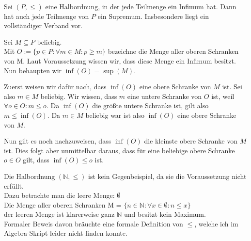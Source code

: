 \begin{exercise}
    Sei $(P,\leq)$ eine Halbordnung, in der jede Teilmenge ein Infimum hat.
    Dann hat auch jede Teilmenge von $P$ ein Supremum. Insbesondere liegt ein
    vollständiger Verband vor.
\end{exercise}
\begin{solution}
Sei $M \subseteq P$ beliebig. \\
Mit $O := \{p \in P: \forall m \in M: p \geq m\}$
bezeichne die Menge aller oberen Schranken von M. Laut Voraussetzung wissen wir,
dass diese Menge ein Infimum besitzt. Nun behaupten wir $\inf(O)  = \sup(M)$. 

Zuerst weisen wir dafür nach, dass $\inf(O)$ eine obere Schranke von $M$ ist. Sei also $m \in M$ beliebig. Wir wissen, dass $m$ eine untere Schranke von $O$ ist, weil $\forall o \in O: m \leq o$. Da $\inf(O)$ die größte untere Schranke ist, gilt also $m \leq \inf(O)$. Da $m \in M$ beliebig war ist also $\inf(O)$ eine obere Schranke von $M$.

Nun gilt es noch nachzuweisen, dass $\inf(O)$ die kleinste obere Schranke von $M$ ist. Dies folgt aber unmittelbar daraus, dass für eine beliebige obere Schranke $o \in O$ gilt, dass $\inf(O) \leq o$ ist.  \newline


Die Halbordnung $(\mathbb{N}, \leq)$ ist kein Gegenbeispiel, da sie die Voraussetzung
nicht erfüllt. \\
Dazu betrachte man die leere Menge: $\emptyset$\\
Die Menge aller oberen Schranken M = $\{n \in \mathbb{N}: \forall x \in \emptyset: n \leq x \}$\\
der leeren Menge ist klarerweise ganz $\mathbb{N}$ und besitzt kein Maximum. \\
Formaler Beweis davon bräuchte eine formale Definition von $\leq$, welche ich
im Algebra-Skript leider nicht finden konnte.
\end{solution}

